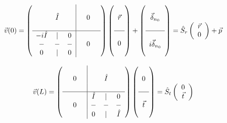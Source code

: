 \begin{equation}
\vec{v}(0) = 
\left( \begin{array}{ccc|ccc}
           &         &    &  &   & \\
           & \hat{I} &    &  & 0 & \\
           &         &    &  &   & \\
\hline
 -i\hat{I} &   |     & 0  &  &   & \\
     -     &   -     & -  &  & 0 & \\
     0     &   |     & 0  &  &   & \\
\end{array} \right)
\left( \begin{array}{c}
\\
 \vec{r} \\
 \\
\hline
  \\
0 \\
  \\
\end{array} \right)
+
\left( \begin{array}{c}
\\
 \vec{\delta}_{n_0} \\
 \\
\hline
  \\
i\vec{\delta}_{n_0} \\
  \\
\end{array} \right)
= \hat{S}_r 
\left( \begin{array}{c}
 \vec{r} \\
 0
\end{array} \right)
+\vec{p}
\end{equation}


\begin{equation}
\vec{v}(L) = 
\left( \begin{array}{ccc|ccc}
  &   &  &         &         &        \\
  & 0 &  &         & \hat{I} &         \\
  &   &  &         &         &         \\
\hline
  &   &  & \hat{I} &   |     &   0     \\
  & 0 &  &   -     &   -     &   -     \\
  &   &  &   0     &   |     & \hat{I} \\
\end{array} \right)
\left( \begin{array}{c}
\\
0 \\
\\
\hline
\\
\vec{t} \\
\\
\end{array} \right)
= \hat{S}_t
\left( \begin{array}{c}
0 \\
\vec{t}
\end{array} \right)
\end{equation}

